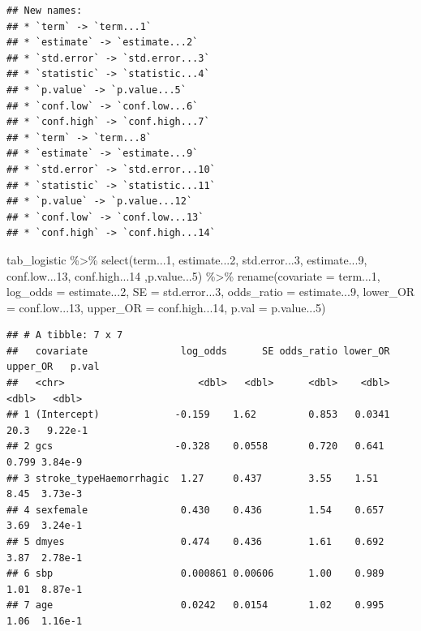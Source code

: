 \documentclass[
  10pt,
]{krantz}
\newenvironment{Shaded}{\begin{snugshade}}{\end{snugshade}}
\newcommand{\AttributeTok}[1]{\textcolor[rgb]{0.77,0.63,0.00}{#1}}
\newcommand{\DecValTok}[1]{\textcolor[rgb]{0.00,0.00,0.81}{#1}}
\newcommand{\FunctionTok}[1]{\textcolor[rgb]{0.00,0.00,0.00}{#1}}
\newcommand{\NormalTok}[1]{#1}
\newcommand{\SpecialCharTok}[1]{\textcolor[rgb]{0.00,0.00,0.00}{#1}}
\begin{document}
\begin{verbatim}
## New names:
## * `term` -> `term...1`
## * `estimate` -> `estimate...2`
## * `std.error` -> `std.error...3`
## * `statistic` -> `statistic...4`
## * `p.value` -> `p.value...5`
## * `conf.low` -> `conf.low...6`
## * `conf.high` -> `conf.high...7`
## * `term` -> `term...8`
## * `estimate` -> `estimate...9`
## * `std.error` -> `std.error...10`
## * `statistic` -> `statistic...11`
## * `p.value` -> `p.value...12`
## * `conf.low` -> `conf.low...13`
## * `conf.high` -> `conf.high...14`
\end{verbatim}

\begin{Shaded}
\begin{Highlighting}[]
\NormalTok{tab\_logistic }\SpecialCharTok{\%\textgreater{}\%} 
  \FunctionTok{select}\NormalTok{(term...}\DecValTok{1}\NormalTok{, estimate...}\DecValTok{2}\NormalTok{, std.error...}\DecValTok{3}\NormalTok{, }
\NormalTok{         estimate...}\DecValTok{9}\NormalTok{, conf.low...}\DecValTok{13}\NormalTok{, conf.high...}\DecValTok{14}\NormalTok{ ,p.value...}\DecValTok{5}\NormalTok{) }\SpecialCharTok{\%\textgreater{}\%}
  \FunctionTok{rename}\NormalTok{(}\AttributeTok{covariate =}\NormalTok{ term...}\DecValTok{1}\NormalTok{, }
         \AttributeTok{log\_odds =}\NormalTok{ estimate...}\DecValTok{2}\NormalTok{,}
         \AttributeTok{SE =}\NormalTok{ std.error...}\DecValTok{3}\NormalTok{,}
         \AttributeTok{odds\_ratio =}\NormalTok{ estimate...}\DecValTok{9}\NormalTok{,}
         \AttributeTok{lower\_OR =}\NormalTok{ conf.low...}\DecValTok{13}\NormalTok{, }
         \AttributeTok{upper\_OR =}\NormalTok{ conf.high...}\DecValTok{14}\NormalTok{,}
         \AttributeTok{p.val =}\NormalTok{ p.value...}\DecValTok{5}\NormalTok{) }
\end{Highlighting}
\end{Shaded}

\begin{verbatim}
## # A tibble: 7 x 7
##   covariate                log_odds      SE odds_ratio lower_OR upper_OR   p.val
##   <chr>                       <dbl>   <dbl>      <dbl>    <dbl>    <dbl>   <dbl>
## 1 (Intercept)             -0.159    1.62         0.853   0.0341   20.3   9.22e-1
## 2 gcs                     -0.328    0.0558       0.720   0.641     0.799 3.84e-9
## 3 stroke_typeHaemorrhagic  1.27     0.437        3.55    1.51      8.45  3.73e-3
## 4 sexfemale                0.430    0.436        1.54    0.657     3.69  3.24e-1
## 5 dmyes                    0.474    0.436        1.61    0.692     3.87  2.78e-1
## 6 sbp                      0.000861 0.00606      1.00    0.989     1.01  8.87e-1
## 7 age                      0.0242   0.0154       1.02    0.995     1.06  1.16e-1
\end{verbatim}
\end{document}
